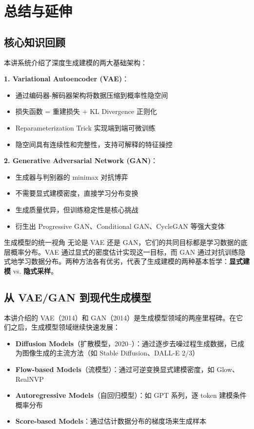 \section{总结与延伸}

\subsection{核心知识回顾}

本讲系统介绍了深度生成建模的两大基础架构：

\textbf{1. Variational Autoencoder (VAE)}：
\begin{itemize}
    \item 通过编码器-解码器架构将数据压缩到概率性隐空间
    \item 损失函数 = 重建损失 + KL Divergence 正则化
    \item Reparameterization Trick 实现端到端可微训练
    \item 隐空间具有连续性和完整性，支持可解释的特征操控
\end{itemize}

\textbf{2. Generative Adversarial Network (GAN)}：
\begin{itemize}
    \item 生成器与判别器的 minimax 对抗博弈
    \item 不需要显式建模密度，直接学习分布变换
    \item 生成质量优异，但训练稳定性是核心挑战
    \item 衍生出 Progressive GAN、Conditional GAN、CycleGAN 等强大变体
\end{itemize}

\begin{importantbox}{生成模型的统一视角}
无论是 VAE 还是 GAN，它们的共同目标都是学习数据的底层概率分布。VAE 通过显式的密度估计实现这一目标，而 GAN 通过对抗训练隐式地学习数据分布。两种方法各有优劣，代表了生成建模的两种基本哲学：\textbf{显式建模} vs. \textbf{隐式采样}。
\end{importantbox}

\subsection{从 VAE/GAN 到现代生成模型}

本讲介绍的 VAE（2014）和 GAN（2014）是生成模型领域的两座里程碑。在它们之后，生成模型领域继续快速发展：

\begin{itemize}
    \item \textbf{Diffusion Models}（扩散模型，2020--）：通过逐步去噪过程生成数据，已成为图像生成的主流方法（如 Stable Diffusion、DALL-E 2/3）
    \item \textbf{Flow-based Models}（流模型）：通过可逆变换显式建模密度，如 Glow、RealNVP
    \item \textbf{Autoregressive Models}（自回归模型）：如 GPT 系列，逐 token 建模条件概率分布
    \item \textbf{Score-based Models}：通过估计数据分布的梯度场来生成样本
\end{itemize}

